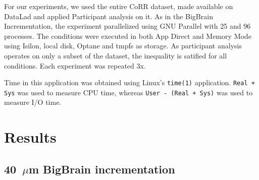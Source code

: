 \documentclass[conference]{IEEEtran}
\newcommand{\bigbrain}{BigBrain\xspace}
\begin{document}
For our experiments, we used the entire CoRR dataset, made available on DataLad and
applied Participant analysis on it. As in the BigBrain Incrementation, the experiment parallelized 
using GNU Parallel with 25 and 96 processes. The conditions were executed in both App Direct and Memory Mode
using Isilon, local disk, Optane and tmpfs as storage. As participant analysis operates on only a subset of the dataset,
the inequality is satified for all conditions. Each experiment was repeated 3x.

Time in this application was obtained using Linux's \texttt{time(1)} application.
\texttt{Real + Sys} was used to measure CPU time,
whereas \texttt{User - (Real + Sys)} was used to measure
I/O time.
\section{Results}

\subsection{40~$\mu$m \bigbrain incrementation}
\end{document}
